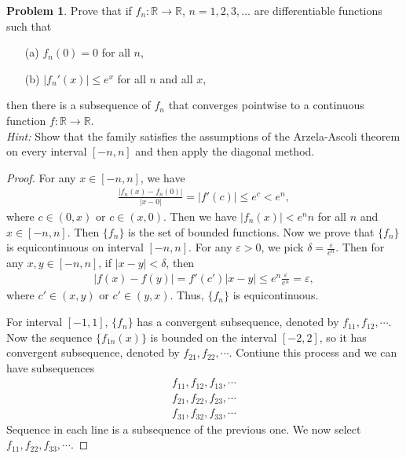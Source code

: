 \documentclass[11pt]{article}
\theoremstyle{definition}
\newtheorem{problem}{Problem}
\theoremstyle{definition}
\begin{document}
\begin{problem}
Prove that if $f_n:\mathbb{R}\to\mathbb{R}$, $n=1,2,3,\ldots$ are differentiable functions such that
\begin{enumerate}
\item[(a)] $f_n(0)=0$ for all $n$,
\item[(b)] $|f_n'(x)|\leq e^x$ for all $n$ and all $x$, 
\end{enumerate}
then there is a subsequence of $f_n$ that converges pointwise to a continuous function $f:\mathbb{R}\to\mathbb{R}$.\\
{\em Hint:} Show that the family satisfies the assumptions of the Arzela-Ascoli theorem on every interval $[-n,n]$ and then apply the diagonal method.
\end{problem}
\begin{proof}
For any $x\in [-n,n]$, we have 
\begin{align*}
    \frac{|f_n(x) - f_n(0)|}{|x - 0|} = |f'(c)| \leq e^c < e^n,
\end{align*}
where $c\in (0,x)$ or $c\in (x,0)$. Then we have $|f_n(x)| < e^n n$ for all $n$ and $x\in [-n,n]$. Then $\{f_n\}$ is the set of bounded functions. Now we prove that $\{f_n\}$ is equicontinuous on interval $[-n,n]$. For any $\varepsilon > 0$, we pick $\delta = \frac{\varepsilon}{e^n}$. Then for any $x, y\in [-n,n]$, if $|x-y| < \delta$, then
\begin{align*}
    |f(x) - f(y)| = f'(c') |x-y| \leq e^n \frac{\varepsilon}{e^n} = \varepsilon,
\end{align*}
where $c' \in (x,y)$ or $c'\in (y,x)$. Thus, $\{f_n\}$ is equicontinuous. 

For interval $[-1,1]$, $\{f_n\}$ has a convergent subsequence, denoted by $f_{11},f_{12},\cdots$. Now the sequence $\{f_{1n}(x)\}$ is bounded on the interval $[-2,2]$, so it has convergent subsequence, denoted by $f_{21}, f_{22}, \cdots$. Contiune this process and we can have subsequences
\begin{align*}
    f_{11},f_{12},f_{13},\cdots \\
    f_{21},f_{22},f_{23},\cdots \\
    f_{31},f_{32},f_{33},\cdots
\end{align*}
Sequence in each line is a subsequence of the previous one. We now select $f_{11}, f_{22}, f_{33},\cdots$. 


\end{proof}
\end{document}

